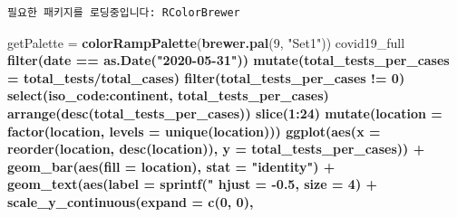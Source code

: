 \documentclass[
  11pt,
]{krantz}
\newenvironment{Shaded}{\begin{snugshade}}{\end{snugshade}}
\newcommand{\DataTypeTok}[1]{\textcolor[rgb]{0.27,0.27,0.27}{#1}}
\newcommand{\DecValTok}[1]{\textcolor[rgb]{0.06,0.06,0.06}{#1}}
\newcommand{\FloatTok}[1]{\textcolor[rgb]{0.06,0.06,0.06}{#1}}
\newcommand{\KeywordTok}[1]{\textcolor[rgb]{0.27,0.27,0.27}{\textbf{#1}}}
\newcommand{\NormalTok}[1]{#1}
\newcommand{\OperatorTok}[1]{\textcolor[rgb]{0.43,0.43,0.43}{\textbf{#1}}}
\newcommand{\StringTok}[1]{\textcolor[rgb]{0.5,0.5,0.5}{#1}}
\begin{document}
\begin{verbatim}
필요한 패키지를 로딩중입니다: RColorBrewer
\end{verbatim}

\begin{Shaded}
\begin{Highlighting}[]
\NormalTok{getPalette =}\StringTok{ }\KeywordTok{colorRampPalette}\NormalTok{(}\KeywordTok{brewer.pal}\NormalTok{(}\DecValTok{9}\NormalTok{, }\StringTok{"Set1"}\NormalTok{))}
\NormalTok{covid19_full }\OperatorTok{%
\StringTok{  }\KeywordTok{filter}\NormalTok{(date }\OperatorTok{==}\StringTok{ }\KeywordTok{as.Date}\NormalTok{(}\StringTok{"2020-05-31"}\NormalTok{)) }\OperatorTok{%
\StringTok{  }\KeywordTok{mutate}\NormalTok{(}\DataTypeTok{total_tests_per_cases =}\NormalTok{ total_tests}\OperatorTok{/}\NormalTok{total_cases) }\OperatorTok{%
\StringTok{  }\KeywordTok{filter}\NormalTok{(total_tests_per_cases }\OperatorTok{!=}\StringTok{ }\DecValTok{0}\NormalTok{) }\OperatorTok{%
\StringTok{  }\KeywordTok{select}\NormalTok{(iso_code}\OperatorTok{:}\NormalTok{continent,}
\NormalTok{         total_tests_per_cases) }\OperatorTok{%
\StringTok{  }\KeywordTok{arrange}\NormalTok{(}\KeywordTok{desc}\NormalTok{(total_tests_per_cases)) }\OperatorTok{%
\StringTok{  }\KeywordTok{slice}\NormalTok{(}\DecValTok{1}\OperatorTok{:}\DecValTok{24}\NormalTok{) }\OperatorTok{%
\StringTok{  }\KeywordTok{mutate}\NormalTok{(}\DataTypeTok{location =} \KeywordTok{factor}\NormalTok{(location,}
                           \DataTypeTok{levels =} \KeywordTok{unique}\NormalTok{(location))) }\OperatorTok{%
\StringTok{  }\KeywordTok{ggplot}\NormalTok{(}\KeywordTok{aes}\NormalTok{(}\DataTypeTok{x =} \KeywordTok{reorder}\NormalTok{(location, }\KeywordTok{desc}\NormalTok{(location)),}
             \DataTypeTok{y =}\NormalTok{ total_tests_per_cases)) }\OperatorTok{+}
\StringTok{  }\KeywordTok{geom_bar}\NormalTok{(}\KeywordTok{aes}\NormalTok{(}\DataTypeTok{fill =}\NormalTok{ location),}
           \DataTypeTok{stat =} \StringTok{"identity"}\NormalTok{) }\OperatorTok{+}
\StringTok{  }\KeywordTok{geom_text}\NormalTok{(}\KeywordTok{aes}\NormalTok{(}\DataTypeTok{label =} \KeywordTok{sprintf}\NormalTok{(}\StringTok{"%
            \DataTypeTok{hjust =} \FloatTok{-0.5}\NormalTok{,}
            \DataTypeTok{size =} \DecValTok{4}\NormalTok{) }\OperatorTok{+}
\StringTok{  }\KeywordTok{scale_y_continuous}\NormalTok{(}\DataTypeTok{expand =} \KeywordTok{c}\NormalTok{(}\DecValTok{0}\NormalTok{, }\DecValTok{0}\NormalTok{),}
}}}}}}}}}
\end{Highlighting}
\end{Shaded}
\end{document}
